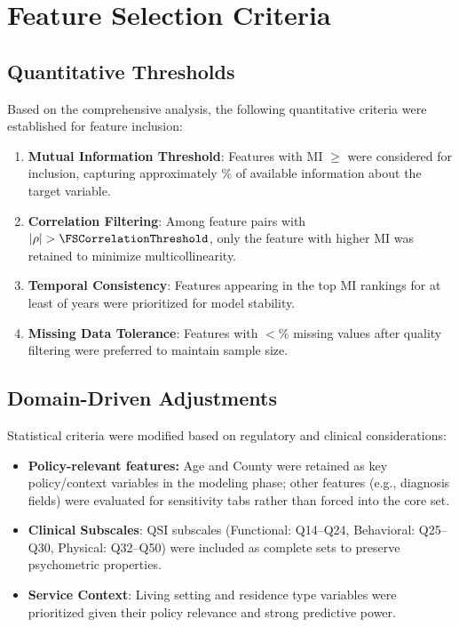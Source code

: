 \section{Feature Selection Criteria}
\label{sec:selection-criteria}

\subsection{Quantitative Thresholds}
\label{subsec:quantitative-thresholds}

Based on the comprehensive analysis, the following quantitative criteria were established for feature inclusion:

\begin{enumerate}
    \item \textbf{Mutual Information Threshold}: Features with MI $\geq$ \FSMIThreshold{} were considered for inclusion, capturing approximately \FSBootstrapStability\% of available information about the target variable.
    
    \item \textbf{Correlation Filtering}: Among feature pairs with $|\rho| > \FSCorrelationThreshold$, only the feature with higher MI was retained to minimize multicollinearity.
    
    \item \textbf{Temporal Consistency}: Features appearing in the top \FSTopTwentyThreshold{} MI rankings for at least \FSTemporalConsistencyYears{} of \FSNumFiscalYears{} years were prioritized for model stability.
    
    \item \textbf{Missing Data Tolerance}: Features with $<$\FSMissingDataThreshold\% missing values after quality filtering were preferred to maintain sample size.
\end{enumerate}

\subsection{Domain-Driven Adjustments}
\label{subsec:domain-adjustments}

Statistical criteria were modified based on regulatory and clinical considerations:

\begin{itemize}
    \item \textbf{Policy-relevant features:} Age and County were retained as key policy/context variables in the modeling phase; other features (e.g., diagnosis fields) were evaluated for sensitivity tabs rather than forced into the core set.

    \item \textbf{Clinical Subscales}: QSI subscales (Functional: Q14--Q24, Behavioral: Q25--Q30, Physical: Q32--Q50) were included as complete sets to preserve psychometric properties.
    

    \item \textbf{Service Context}: Living setting and residence type variables were prioritized given their policy relevance and strong predictive power.
\end{itemize}




